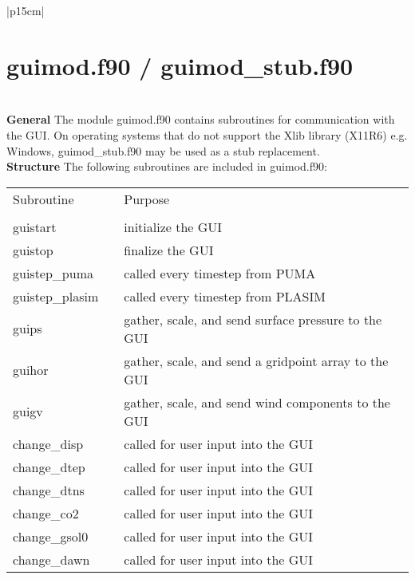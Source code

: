 
\begin{center}
\begin{tabular}{|p{15cm}|}
\hline
\vspace{-5mm} \section{guimod.f90 / guimod\_stub.f90} \vspace{-5mm} \\
\hline
\vspace{1mm} {\bf General} The module {\module guimod.f90}
contains subroutines for communication with the GUI.
On operating systems that do not support the Xlib library (X11R6) e.g. Windows,
{\module guimod\_stub.f90} may be used as a stub replacement.
\vspace{3mm} \\
\hline
\vspace{2mm} {\bf Structure}
The following subroutines are included in {\module guimod.f90}:

\begin{center}
\begin{tabular}{l p{2cm} l}
Subroutine & &Purpose \\
&& \\
{\sub guistart} && initialize the GUI \\
{\sub guistop}  && finalize the GUI \\
{\sub guistep\_puma} && called every timestep from PUMA \\
{\sub guistep\_plasim} && called every timestep from PLASIM \\
{\sub guips} && gather, scale, and send surface pressure to the GUI \\
{\sub guihor} && gather, scale, and send a gridpoint array to the GUI \\
{\sub guigv} && gather, scale, and send wind components to the GUI \\
{\sub change\_disp} && called for user input into the GUI \\
{\sub change\_dtep} && called for user input into the GUI \\
{\sub change\_dtns} && called for user input into the GUI \\
{\sub change\_co2} && called for user input into the GUI \\
{\sub change\_gsol0} && called for user input into the GUI \\
{\sub change\_dawn} && called for user input into the GUI \\
\end{tabular}
\end{center}
\vspace{3mm} \\
\hline
\end{tabular}
\end{center}
\newpage

